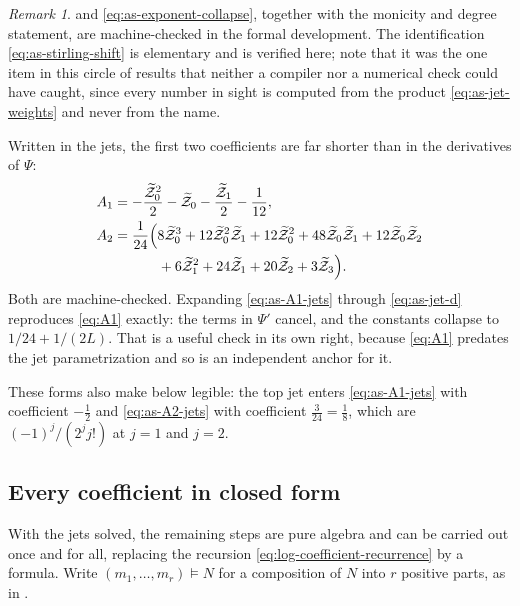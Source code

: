 \documentclass[11pt,oneside]{article}
\theoremstyle{definition}
\theoremstyle{remark}
\newtheorem{remark}[theorem]{Remark}
\begin{document}
\begin{remark}
 and \eqref{eq:as-exponent-collapse}, together with the
monicity and degree statement, are machine-checked in the formal development.  The
identification \eqref{eq:as-stirling-shift} is elementary and is verified here; note that it
was the one item in this circle of results that neither a compiler nor a numerical check
could have caught, since every number in sight is computed from the product
\eqref{eq:as-jet-weights} and never from the name.
\end{remark}

Written in the jets, the first two coefficients are far shorter than in the derivatives of
$\Psi$:
\begin{align}
 A_1&=-\frac{\widetilde{\mathcal Z}_0^{2}}{2}-\widetilde{\mathcal Z}_0
      -\frac{\widetilde{\mathcal Z}_1}{2}-\frac1{12},      \label{eq:as-A1-jets}\\
 A_2&=\frac1{24}\Bigl(8\widetilde{\mathcal Z}_0^{3}
      +12\widetilde{\mathcal Z}_0^{2}\widetilde{\mathcal Z}_1
      +12\widetilde{\mathcal Z}_0^{2}
      +48\widetilde{\mathcal Z}_0\widetilde{\mathcal Z}_1
      +12\widetilde{\mathcal Z}_0\widetilde{\mathcal Z}_2                 \notag\\
   &\hspace{3.2em}
      +6\widetilde{\mathcal Z}_1^{2}+24\widetilde{\mathcal Z}_1
      +20\widetilde{\mathcal Z}_2+3\widetilde{\mathcal Z}_3\Bigr).        \label{eq:as-A2-jets}
\end{align}
Both are machine-checked.  Expanding \eqref{eq:as-A1-jets} through \eqref{eq:as-jet-d}
reproduces \eqref{eq:A1} exactly: the terms in $\Psi'$ cancel, and the constants collapse to
$1/24+1/(2L)$.  That is a useful check in its own right, because \eqref{eq:A1} predates the
jet parametrization and so is an independent anchor for it.

These forms also make  below legible: the top jet enters
\eqref{eq:as-A1-jets} with coefficient $-\tfrac12$ and \eqref{eq:as-A2-jets} with
coefficient $\tfrac3{24}=\tfrac18$, which are $(-1)^{j}/(2^{j}j!)$ at $j=1$ and $j=2$.

\subsection{Every coefficient in closed form}
\label{subsec:as-general-coefficient}

With the jets solved, the remaining steps are pure algebra and can be carried out once and
for all, replacing the recursion \eqref{eq:log-coefficient-recurrence} by a formula.  Write
$(m_1,\ldots,m_r)\vDash N$ for a composition of $N$ into $r$ positive parts, as in
.
\end{document}
